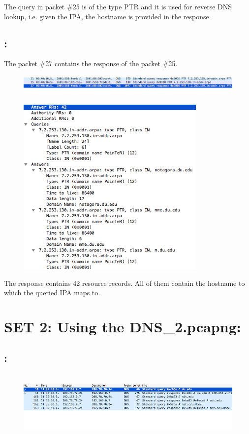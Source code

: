 \documentclass[]{report}
\begin{document}
The query in packet \#25 is of the type PTR and it is used for reverse DNS lookup, i.e. given the IPA, the hostname is provided in the response. 

\subsection{:}

The packet \#27 contains the response of the packet \#25.
\begin{figure}[H]
	\vspace{0pt}
	\includegraphics[height = 30pt, keepaspectratio]{Snapshots/q1/1_8_1.png}
\end{figure}

\begin{figure}[H]
	\vspace{0pt}
	\includegraphics[height = 250pt, keepaspectratio]{Snapshots/q1/1_8_2.png}
\end{figure}
The response contains 42 resource records. All of them contain the hostname to which the queried IPA maps to. 

\section{SET 2: Using the DNS\_2.pcapng:}

\subsection{:}

\begin{figure}[H]
	\vspace{0pt}
	\includegraphics[height = 100pt, keepaspectratio]{Snapshots/q2/2_1_1.png}
\end{figure}
\end{document}

